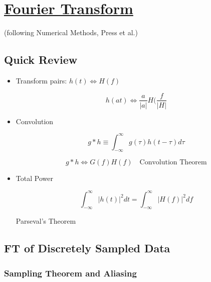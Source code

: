 \def \secname {Fourier Transform}

\section[\secname]{\hyperlink{toc}{\secname}}



(following Numerical Methods, Press et al.)

\subsection{Quick Review}

\begin{itemize}
    \item Transform pairs: $h(t) \Longleftrightarrow H(f)$

    \[ h(at) \Longleftrightarrow \frac{a}{|a|} H(\frac{f}{|H|}\]

    \item Convolution

    \[ g*h \equiv \int_{-\infty}^{\infty} g(\tau) h(t-\tau)d\tau\]

    \[ g*h \Longleftrightarrow G(f)H(f) \quad \text{Convolution Theorem}\]

    \item Total Power 

    \[ \int_{-\infty}^{\infty} |h(t)|^2dt = \int_{-\infty}^{\infty} |H(f)|^2 df\]

    Parseval's Theorem

\end{itemize}

\subsection{FT of Discretely Sampled Data}

\subsubsection{Sampling Theorem and Aliasing}

